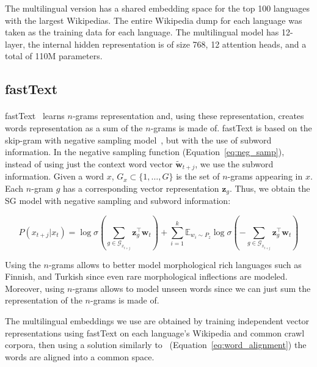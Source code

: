 The multilingual version has a shared embedding space for the top 100 languages with the largest Wikipedias. The entire Wikipedia dump for each language was taken as the training data for each language. The multilingual model has 12-layer, the internal hidden representation is of size 768, 12 attention heads, and a total of 110M parameters.

\subsection{fastText}
\paragraph{}
fastText~\citep{bojanowski2016enriching} learns $n$-grams representation and, using these representation, creates words representation as a sum of the $n$-grams is made of. fastText is based on the skip-gram with negative sampling model~\citep{mikolov2013distributed}, but with the use of subword information. In the negative sampling function (Equation~\ref{eq:neg_samp}), instead of using just the context word vector $\mathbf{\tilde{w}}_{t+j}$, we use the subword information. Given a word $x$, $G_x \subset \{1, \dots, G\}$ is the set of $n$-grams appearing in $x$. Each $n$-gram $g$ has a corresponding vector representation $\mathbf{z}_{g}$. Thus, we obtain the SG model with negative sampling and subword information:  

\begin{equation}
P\left(x_{t+j} | x_{t}\right)=\log \sigma\left( \sum_{g \in \mathcal{G}_{x_{t+j}}} \mathbf{z}_{g}^{\top} \mathbf{w}_{t}\right)+\sum_{i=1}^{k} \mathbb{E}_{w_{i} \sim P_{z}} \log \sigma\left(- \sum_{g \in \mathcal{G}_{x_{t+j}}} \mathbf{z}_{g}^{\top}\mathbf{w}_{t}\right)
\end{equation}

Using the $n$-grams allows to better model morphological rich languages such as Finnish, and Turkish since even rare morphological inflections are modeled. Moreover, using $n$-grams allows to model unseen words since we can just sum the representation of the $n$-grams is made of. 

The multilingual embeddings we use are obtained by training independent vector representations using fastText on each language's Wikipedia and common crawl corpora, then using a solution similarly to~\citep{mikolov2013exploiting} (Equation~\ref{eq:word_alignment}) the words are aligned into a common space. 

